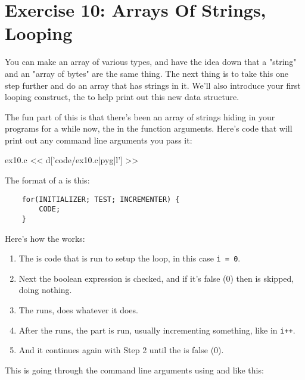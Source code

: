 \chapter{Exercise 10: Arrays Of Strings, Looping}

You can make an array of various types, and have the idea down that a
"string" and an "array of bytes" are the same thing.  The next thing is
to take this one step further and do an array that has strings in it.
We'll also introduce your first looping construct, the 
to help print out this new data structure.

The fun part of this is that there's been an array of strings hiding in
your programs for a while now, the  in the 
function arguments.  Here's code that will print out any command line
arguments you pass it:

\begin{code}{ex10.c}
<< d['code/ex10.c|pyg|l'] >>
\end{code}

The format of a  is this:

\begin{Verbatim}
    for(INITIALIZER; TEST; INCREMENTER) {
        CODE;
    }
\end{Verbatim}

Here's how the  works:

\begin{enumerate}
\item The  is code that is run to setup the loop, in this
    case \verb|i = 0|.
\item Next the  boolean expression is checked, and if it's false (0)
    then  is skipped, doing nothing.
\item The  runs, does whatever it does.
\item After the  runs, the  part is run, usually
    incrementing something, like in \verb|i++|.
\item And it continues again with Step 2 until the  is false (0).
\end{enumerate}

This  is going through the command line arguments 
using  and  like this:

